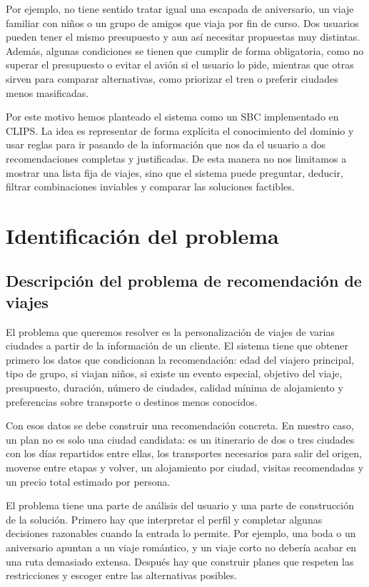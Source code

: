 \documentclass[11pt,a4paper]{article}
\begin{document}
Por ejemplo, no tiene sentido tratar igual una escapada de aniversario, un
viaje familiar con ni\~nos o un grupo de amigos que viaja por fin de curso. Dos
usuarios pueden tener el mismo presupuesto y aun as\'i necesitar propuestas muy
distintas. Adem\'as, algunas condiciones se tienen que cumplir de forma
obligatoria, como no superar el presupuesto o evitar el avi\'on si el usuario lo
pide, mientras que otras sirven para comparar alternativas, como priorizar el
tren o preferir ciudades menos masificadas.

Por este motivo hemos planteado el sistema como un SBC implementado en CLIPS.
La idea es representar de forma expl\'icita el conocimiento del dominio y usar
reglas para ir pasando de la informaci\'on que nos da el usuario a dos
recomendaciones completas y justificadas. De esta manera no nos limitamos a
mostrar una lista fija de viajes, sino que el sistema puede preguntar, deducir,
filtrar combinaciones inviables y comparar las soluciones factibles.


\section{Identificaci\'on del problema}
\subsection{Descripci\'on del problema de recomendaci\'on de viajes}
El problema que queremos resolver es la personalizaci\'on de viajes de varias
ciudades a partir de la informaci\'on de un cliente. El sistema tiene que
obtener primero los datos que condicionan la recomendaci\'on: edad del viajero
principal, tipo de grupo, si viajan ni\~nos, si existe un evento especial,
objetivo del viaje, presupuesto, duraci\'on, n\'umero de ciudades, calidad
m\'inima de alojamiento y preferencias sobre transporte o destinos menos
conocidos.

Con esos datos se debe construir una recomendaci\'on concreta. En nuestro caso,
un plan no es solo una ciudad candidata: es un itinerario de dos o tres
ciudades con los d\'ias repartidos entre ellas, los transportes necesarios para
salir del origen, moverse entre etapas y volver, un alojamiento por ciudad,
visitas recomendadas y un precio total estimado por persona.

El problema tiene una parte de an\'alisis del usuario y una parte de
construcci\'on de la soluci\'on. Primero hay que interpretar el perfil y completar
algunas decisiones razonables cuando la entrada lo permite. Por ejemplo, una
boda o un aniversario apuntan a un viaje rom\'antico, y un viaje corto no deber\'ia
acabar en una ruta demasiado extensa. Despu\'es hay que construir planes que
respeten las restricciones y escoger entre las alternativas posibles.
\end{document}
